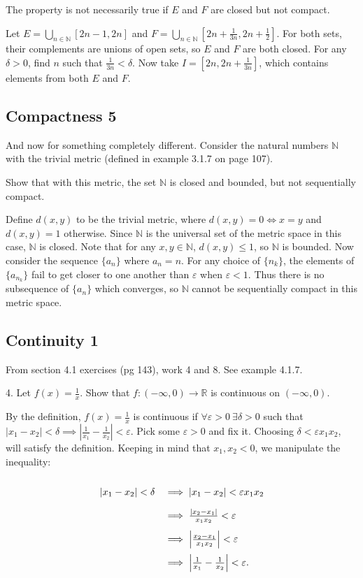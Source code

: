 \documentclass[11pt]{article}
\newcommand{\N}{\mathbb{N}}
\newcommand{\R}{\mathbb{R}}
\begin{document}
The property is not necessarily true if $E$ and $F$ are closed but not
compact. 

Let $E = \bigcup_{n\in\N}[2n-1, 2n]$ and
$F = \bigcup_{n\in\N}[2n+\frac{1}{3n}, 2n+\frac{1}{2}]$. For both sets,
their complements are unions of open sets, so $E$ and $F$ are both closed.
For any $\delta>0$, find $n$ such that $\frac{1}{3n}<\delta$. Now take
$I=[2n,2n+\frac{1}{3n}]$, which contains elements from both $E$ and $F$. 

\subsection*{Compactness 5}

And now for something completely different. Consider the natural numbers $\N$ with the trivial metric (defined in example 3.1.7 on page 107). 

Show that with this metric, the set $\N$ is closed and bounded, but not sequentially compact.

Define $d(x,y)$ to be the trivial metric, where $d(x,y)=0 \iff x=y$ and
$d(x,y) = 1$ otherwise.
Since $\N$ is the universal set of the metric space in this case, $\N$
is closed. Note that for any $x,y\in\N$, $d(x,y)\leq1$, so $\N$ is bounded.
Now consider the sequence $\{a_n\}$ where $a_n = n$. For any choice of
$\{n_k\}$, the elements of $\{a_{n_k}\}$ fail to get closer to one another
than $\varepsilon$ when $\varepsilon<1$. Thus there is no subsequence of
$\{a_n\}$ which converges, so $\N$ cannot be sequentially compact
in this metric space.

\subsection*{Continuity 1}

From section 4.1 exercises (pg 143), work 4 and 8. See example 4.1.7.

4. Let $f(x) = \frac{1}{x}$. Show that $f:(-\infty,0)\to\R$ is continuous
on $(-\infty,0)$.

By the definition, $f(x)=\frac{1}{x}$ is continuous if
$\forall \varepsilon>0\ \exists\delta>0$ such that
$|x_1-x_2|<\delta\implies\left|\frac{1}{x_1}-\frac{1}{x_2}\right|<\varepsilon$.
Pick some $\varepsilon>0$ and fix it. Choosing
$\delta<\varepsilon x_1 x_2$, will satisfy the definition. Keeping in
mind that $x_1, x_2 < 0$, we manipulate the inequality:

\[
\def\arraystretch{2}
\begin{array}{rl}
|x_1-x_2|<\delta &\implies |x_1-x_2|<\varepsilon x_1 x_2 \\
&\implies \frac{|x_2-x_1|}{x_1 x_2}<\varepsilon \\
&\implies \left|\frac{x_2-x_1}{x_1x_2}\right|<\varepsilon \\
&\implies \left|\frac{1}{x_1}-\frac{1}{x_2}\right|<\varepsilon.
\end{array}
\]
\end{document}

